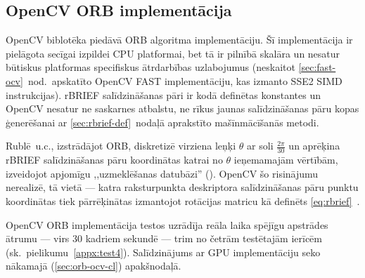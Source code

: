 \subsection{OpenCV ORB implementācija}
OpenCV biblotēka\cite{OpenCV-src} piedāvā ORB algoritma implementāciju.
Šī implementācija ir pielāgota secīgai izpildei CPU platformai,
bet tā ir pilnībā skalāra un nesatur būtiskus platformas specifiskus
ātrdarbības uzlabojumus (neskaitot \ref{sec:fast-ocv}~nod.~apskatīto
OpenCV FAST implementāciju, kas izmanto SSE2 SIMD instrukcijas).
rBRIEF salīdzināšanas pāri ir kodā definētas konstantes un
OpenCV nesatur ne saskarnes atbalstu, ne rīkus jaunas salīdzināšanas pāru 
kopas ģenerēšanai ar \ref{sec:rbrief-def}~nodaļā aprakstīto mašīnmācīšanās
metodi.

Rublē~u.c.\cite{ORB}, izstrādājot ORB, diskretizē virziena leņķi $\theta$ ar soli
$\frac{2\pi}{30}$ un aprēķina rBRIEF salīdzināšanas pāru koordinātas katrai no
$\theta$ ieņemamajām vērtībām, izveidojot apjomīgu
,,uzmeklēšanas datubāzi'' ().
OpenCV šo risinājumu nerealizē, tā vietā --- katra raksturpunkta
deskriptora
salīdzināšanas pāru punktu koordinātas tiek pārrēķinātas 
izmantojot rotācijas matricu kā definēts \eqref{eq:rbrief}~\cite{OpenCV-src}.

OpenCV ORB implementācija testos uzrādīja reāla laika spējīgu
apstrādes ātrumu --- virs 30 kadriem sekundē --- trim no četrām testētajām
ierīcēm (sk.~pielikumu~\ref{appx:test4}).
Salīdzinājums ar GPU implementāciju seko nākamajā (\ref{sec:orb-ocv-cl})
apakšnodaļā.

